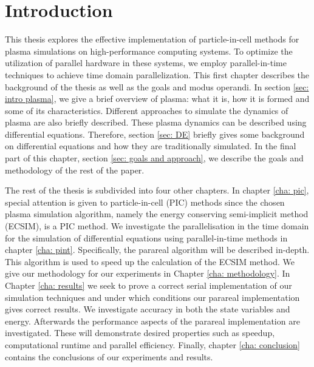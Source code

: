 \chapter{Introduction}
\label{cha: intro}
This thesis explores the effective implementation of particle-in-cell methods for plasma simulations on high-performance computing systems. To optimize the utilization of parallel hardware in these systems, we employ parallel-in-time techniques to achieve time domain parallelization. 
This first chapter describes the background of the thesis as well as the goals and modus operandi. In section \ref{sec: intro plasma}, we give a brief overview of plasma: what it is, how it is formed and some of its characteristics. Different approaches to simulate the dynamics of plasma are also briefly described. 
These plasma dynamics can be described using differential equations. Therefore, section \ref{sec: DE} briefly gives some background on differential equations and how they are traditionally simulated. 
In the final part of this chapter, section \ref{sec: goals and approach}, we describe the goals and methodology of the rest of the paper.

The rest of the thesis is subdivided into four other chapters. 
In chapter \ref{cha: pic}, special attention is given to particle-in-cell (PIC) methods since the chosen plasma simulation algorithm, namely the energy conserving semi-implicit method (ECSIM), is a PIC method.  
We investigate the parallelisation in the time domain for the simulation of differential equations using parallel-in-time methods in chapter \ref{cha: pint}. Specifically, the parareal algorithm will be described in-depth. This algorithm is used to speed up the calculation of the ECSIM method. We give our methodology for our experiments in Chapter \ref{cha: methodology}. In Chapter \ref{cha: results} we seek to prove a correct serial implementation of our simulation techniques and under which conditions our parareal implementation gives correct results. We investigate accuracy in both the state variables and energy. Afterwards the performance aspects of the parareal implementation are investigated. These will demonstrate desired properties such as speedup, computational runtime and parallel efficiency. Finally, chapter \ref{cha: conclusion} contains the conclusions of our experiments and results.


